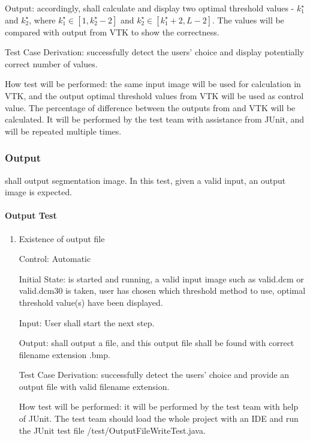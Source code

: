 \documentclass[12pt, titlepage]{article}
\begin{document}
\begin{enumerate}
Output: accordingly, \progname{} shall calculate and display two optimal
threshold values - $k^{\star}_{1}$ and $k^{\star}_{2}$, where $k^{\star}_{1}
\in[1, k^{\star}_{2}-2]$ and $k^{\star}_{2} \in [k^{\star}_{1}+2,L-2]$. The
values
will be compared with output from VTK to show the correctness.

Test Case Derivation: successfully detect the users' choice and display
potentially correct number of values.

How test will be performed: the same input image will be used for calculation
in VTK, and the output optimal threshold values from VTK will be used as control
value. The percentage of difference between the outputs from \progname{} and
VTK will be calculated. It will be performed by the test team with assistance
from
JUnit, and will be repeated multiple times.

\end{enumerate}

\subsubsection{Output}
\label{sec_outputtest}

\progname{} shall output segmentation image. In this test, given a valid input,
an output image is expected.
		
\paragraph{Output Test}

\begin{enumerate}

\item{Existence of output file}

Control: Automatic
					
Initial State: \progname{} is started and running, a valid input image such as
valid.dcm or valid.dcm30 is taken, user has chosen which threshold method to
use, optimal threshold value(s) have been displayed.
					
Input: User shall start the next step.
					
Output: \progname{} shall output a file, and this output file shall be found
with correct filename extension .bmp.

Test Case Derivation: successfully detect the users' choice and provide an
output file with valid filename extension.

How test will be performed: it will be performed by the test team with help of
JUnit. The test team should load the whole project with an IDE and run the
JUnit test file /test/OutputFileWriteTest.java. 

\end{enumerate}
\end{document}
